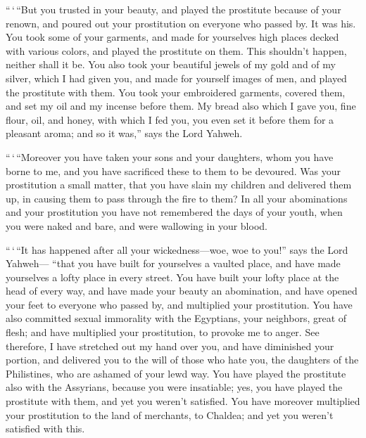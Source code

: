  ``\,`\,``But you trusted in your beauty, and played the
prostitute because of your renown, and poured out your prostitution on
everyone who passed by. It was his.  You took some of
your garments, and made for yourselves high places decked with various
colors, and played the prostitute on them. This shouldn't happen,
neither shall it be.  You also took your beautiful jewels
of my gold and of my silver, which I had given you, and made for
yourself images of men, and played the prostitute with them.
 You took your embroidered garments, covered them, and
set my oil and my incense before them.  My bread also
which I gave you, fine flour, oil, and honey, with which I fed you, you
even set it before them for a pleasant aroma; and so it was,'' says the
Lord Yahweh.

 ``\,`\,``Moreover you have taken your sons and your
daughters, whom you have borne to me, and you have sacrificed these to
them to be devoured. Was your prostitution a small matter,
 that you have slain my children and delivered them up,
in causing them to pass through the fire to them?  In all
your abominations and your prostitution you have not remembered the days
of your youth, when you were naked and bare, and were wallowing in your
blood.

 ``\,`\,``It has happened after all your
wickedness---woe, woe to you!'' says the Lord Yahweh--- 
``that you have built for yourselves a vaulted place, and have made
yourselves a lofty place in every street.  You have built
your lofty place at the head of every way, and have made your beauty an
abomination, and have opened your feet to everyone who passed by, and
multiplied your prostitution.  You have also committed
sexual immorality with the Egyptians, your neighbors, great of flesh;
and have multiplied your prostitution, to provoke me to anger.
 See therefore, I have stretched out my hand over you,
and have diminished your portion, and delivered you to the will of those
who hate you, the daughters of the Philistines, who are ashamed of your
lewd way.  You have played the prostitute also with the
Assyrians, because you were insatiable; yes, you have played the
prostitute with them, and yet you weren't satisfied.  You
have moreover multiplied your prostitution to the land of merchants, to
Chaldea; and yet you weren't satisfied with this.

